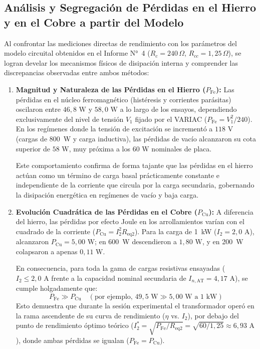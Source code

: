 \subsection{Análisis y Segregación de Pérdidas en el Hierro y en el Cobre a partir del Modelo}

Al confrontar las mediciones directas de rendimiento con los parámetros del modelo circuital obtenidos en el Informe N°~4 ($R_c = 240\,\Omega$, $R_{cc} = 1{,}25\,\Omega$), se logran develar los mecanismos físicos de disipación interna y comprender las discrepancias observadas entre ambos métodos:
\begin{enumerate}
    \item \textbf{Magnitud y Naturaleza de las Pérdidas en el Hierro ($P_{\text{Fe}}$):}
    Las pérdidas en el núcleo ferromagnético (histéresis y corrientes parásitas) oscilaron entre $46{,}8\text{ W}$ y $58{,}0\text{ W}$ a lo largo de los ensayos, dependiendo exclusivamente del nivel de tensión $V_1$ fijado por el VARIAC ($P_{\text{Fe}} = V_1^2 / 240$). En los regímenes donde la tensión de excitación se incrementó a $118\text{ V}$ (cargas de 800~W y carga inductiva), las pérdidas de vacío alcanzaron su cota superior de $58\text{ W}$, muy próxima a los $60\text{ W}$ nominales de placa.
    
    Este comportamiento confirma de forma tajante que las pérdidas en el hierro actúan como un término de carga basal prácticamente constante e independiente de la corriente que circula por la carga secundaria, gobernando la disipación energética en regímenes de vacío y baja carga.

    \item \textbf{Evolución Cuadrática de las Pérdidas en el Cobre ($P_{\text{Cu}}$):}
    A diferencia del hierro, las pérdidas por efecto Joule en los arrollamientos varían con el cuadrado de la corriente ($P_{\text{Cu}} = I_2^2 R_{\text{eq2}}$). Para la carga de 1~kW ($I_2 = 2{,}0\text{ A}$), alcanzaron $P_{\text{Cu}} = 5{,}00\text{ W}$; en 600~W descendieron a $1{,}80\text{ W}$, y en 200~W colapsaron a apenas $0{,}11\text{ W}$.
    
    En consecuencia, para toda la gama de cargas resistivas ensayadas ($I_2 \le 2{,}0\text{ A}$ frente a la capacidad nominal secundaria de $I_{n,\text{AT}} = 4{,}17\text{ A}$), se cumple holgadamente que:
    \begin{equation}
        P_{\text{Fe}} \gg P_{\text{Cu}} \quad (\text{por ejemplo, } 49{,}5\text{ W} \gg 5{,}00\text{ W a 1~kW})
    \end{equation}
    Esto demuestra que durante la sesión experimental el transformador operó en la rama ascendente de su curva de rendimiento ($\eta$ vs. $I_2$), por debajo del punto de rendimiento óptimo teórico ($I_2^* = \sqrt{P_{\text{Fe}}/R_{\text{eq2}}} = \sqrt{60/1{,}25} \approx 6{,}93\text{ A}$), donde ambas pérdidas se igualan ($P_{\text{Fe}} = P_{\text{Cu}}$).


\end{enumerate}
